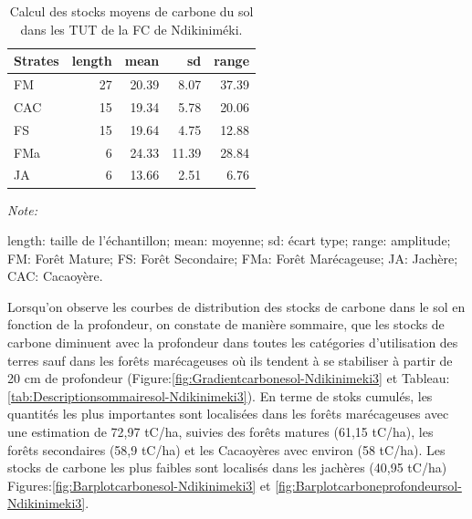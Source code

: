\documentclass[
  12pt,
  a4paper,
  extrafontsizes,
  onecolumn,
  openright]{book}
\theoremstyle{definition}
\theoremstyle{definition}
\theoremstyle{definition}
\theoremstyle{definition}
\theoremstyle{remark}
\begin{document}
\begin{table}
\centering
\caption{\label{tab:Stocksmoyenssol-Ndikinimeki3}Calcul des stocks moyens de carbone du sol dans les TUT de la FC de Ndikiniméki.}
\centering
\begin{threeparttable}
\begin{tabular}[t]{lrrrr}
\toprule
Strates & length & mean & sd & range\\
\midrule
FM & 27 & 20.39 & 8.07 & 37.39\\
CAC & 15 & 19.34 & 5.78 & 20.06\\
FS & 15 & 19.64 & 4.75 & 12.88\\
FMa & 6 & 24.33 & 11.39 & 28.84\\
JA & 6 & 13.66 & 2.51 & 6.76\\
\bottomrule
\end{tabular}
\begin{tablenotes}
\item \textit{Note: } 
\item length: taille de l'échantillon; mean: moyenne; sd: écart type; range: amplitude; FM: Forêt Mature; FS: Forêt Secondaire; FMa: Forêt Marécageuse; JA: Jachère; CAC: Cacaoyère.
\end{tablenotes}
\end{threeparttable}
\end{table}

Lorsqu'on observe les courbes de distribution des stocks de carbone dans le sol en fonction de la profondeur, on constate de manière sommaire, que les stocks de carbone diminuent avec la profondeur dans toutes les catégories d'utilisation des terres sauf dans les forêts marécageuses où ils tendent à se stabiliser à partir de 20 cm de profondeur (Figure:\ref{fig:Gradientcarbonesol-Ndikinimeki3} et Tableau:\ref{tab:Descriptionsommairesol-Ndikinimeki3}). En terme de stoks cumulés, les quantités les plus importantes sont localisées dans les forêts marécageuses avec une estimation de 72,97 tC/ha, suivies des forêts matures (61,15 tC/ha), les forêts secondaires (58,9 tC/ha) et les Cacaoyères avec environ (58 tC/ha). Les stocks de carbone les plus faibles sont localisés dans les jachères (40,95 tC/ha) Figures:\ref{fig:Barplotcarbonesol-Ndikinimeki3} et \ref{fig:Barplotcarboneprofondeursol-Ndikinimeki3}.
\end{document}

